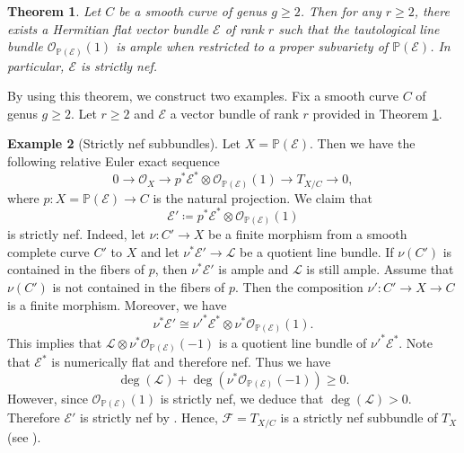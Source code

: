 \documentclass[english,reqno]{amsart}
\newcommand\bbP{{\mathbb P}}
\newcommand\sE{{\mathscr E}}
\newcommand\sF{{\mathscr F}}
\newcommand\sL{{\mathscr L}}
\newcommand\sO{{\mathscr O}}
\theoremstyle{plain}
\newtheorem{thm}{Theorem}[section]
\theoremstyle{definition}
\newtheorem{example}[thm]{Example}
\numberwithin{equation}{section} %
\begin{document}
\begin{thm}\cite[Lemma 3.2 and Theorem 6.1]{Subramanian1989}\label{Subramanian}
    Let $C$ be a smooth curve of genus $g\geqslant 2$. Then for any $r\geqslant 2$, there exists a Hermitian flat vector bundle $\sE$ of rank $r$ such that the tautological line bundle $\sO_{\bbP(\sE)}(1)$ is ample when restricted to a proper subvariety of $\bbP(\sE)$. In particular, $\sE$ is strictly nef.
\end{thm}

By using this theorem, we construct  two examples.  Fix  a smooth  curve $C$ of genus $g \geqslant 2$. Let  $r\geqslant 2$ and  $\sE$  a vector bundle of rank $r$ provided in Theorem \ref{Subramanian}.

\begin{example}[Strictly nef subbundles]
    \label{example:subbundles}
    Let $X=\bbP(\sE)$. Then we have the following relative Euler exact sequence
    \[0\rightarrow \sO_X\rightarrow p^*\sE^*\otimes\sO_{\bbP(\sE)}(1)\rightarrow T_{X/C}\rightarrow 0,\]
    where $p\colon X=\bbP(\sE)\rightarrow C$ is the natural projection.
    We claim that $$\sE'\coloneqq p^*\sE^*\otimes \sO_{\bbP(\sE)}(1)$$ is strictly nef.
    Indeed, let $\nu\colon C'\rightarrow X$ be a finite morphism from a  smooth complete curve $C'$ to $X$ and let $\nu^*\sE'\rightarrow \sL$ be a quotient line bundle. If $\nu(C')$ is contained in the fibers of $p$, then $\nu^*\sE'$ is ample and $\sL$ is still ample.
    Assume that $\nu(C')$ is not contained in the fibers of $p$. Then the composition $\nu'\colon C'\rightarrow X\rightarrow C$ is a finite morphism. Moreover, we have
    \[\nu^*\sE'\cong  \nu'^*\sE^*\otimes \nu^*\sO_{\bbP(\sE)}(1).\]
    This implies that $\sL\otimes \nu^*\sO_{\bbP(\sE)}(-1)$ is a quotient line bundle of $\nu'^*\sE^*$. Note that $\sE^*$ is numerically flat and therefore nef. Thus we have
    \[
    \deg(\sL)+\deg(\nu^*\sO_{\bbP(\sE)}(-1))\geqslant 0.
    \]
    However,  since $\sO_{\bbP(\sE)}(1)$ is strictly nef, we deduce that $\deg(\sL)>0$.  Therefore $\sE'$ is strictly nef by \cite[Proposition 2.1]{LiOuYang2019}. Hence, $\sF = T_{X/C}$ is a strictly nef subbundle of $T_X$ (see \cite[Propostion 2.2]{LiOuYang2019}).
\end{example}
\end{document}
